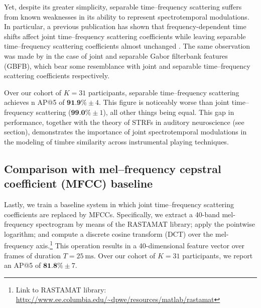 \documentclass{bmcart}
\newcommand{\lnameref}[1]{%
\bgroup
\let\nmu\MakeLowercase
\nameref{#1}\egroup}
\newcommand{\nmu}{}
\begin{document}
Yet, despite its greater simplicity, separable time--frequency scattering suffers from known weaknesses in its ability to represent spectrotemporal modulations.
In particular, a previous publication has shown that frequency-dependent time shifts affect joint time--frequency scattering coefficients while leaving separable time--frequency scattering coefficients almost unchanged \cite{anden2019tsp}.
The same observation was made by \cite{schadler2015jasa} in the case of joint and separable Gabor filterbank features (GBFB), which bear some resemblance with joint and separable time--frequency scattering coefficients respectively.

Over our cohort of $K=31$ participants, separable time--frequency scattering achieves n AP@5 of $\textbf{91.9\%} \pm 4$. This figure is noticeably worse than joint time--frequency scattering ($\textbf{99.0}\% \pm 1$), all other things being equal.
This gap in performance, together with the theory of STRFs in auditory neuroscience (see \lnameref{sec:related-work} section), demonstrates the importance of joint spectrotemporal modulations in the modeling of timbre similarity across instrumental playing techniques.


\subsection*{Comparison with mel--frequency cepstral coefficient (MFCC) baseline}
Lastly, we train a baseline system in which joint time--frequency scattering coefficients are replaced by MFCCs.
Specifically, we extract a 40-band mel-frequency spectrogram by means of the RASTAMAT library; apply the pointwise logarithm; and compute a discrete cosine transform (DCT) over the mel-frequency axis.\footnote{Link to RASTAMAT library: \url{http://www.ee.columbia.edu/~dpwe/resources/matlab/rastamat}}
This operation results in a 40-dimensional feature vector over frames of duration $T=\SI{25}{\milli\second}$.
Over our cohort of $K=31$ participants, we report an AP@5 of $\textbf{81.8\%} \pm 7$.
\end{document}
